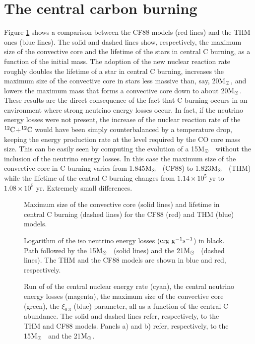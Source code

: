 \documentclass{aastex631}
\newcommand{\msun}{$\rm M_\odot$}
\newcommand\nuk[2]{$\rm ^{\rm #2} #1$}
\begin{document}
\section{The central carbon burning} \label{sec:carcen}
Figure \ref{fig:cbur} shows a comparison between the CF88 models (red lines) and the THM ones (blue lines). The solid and dashed lines show, respectively, the maximum size of the convective core and the lifetime of the stars in central C burning, as a function of the initial mass. The adoption of the new nuclear reaction rate roughly doubles the lifetime of a star in central C burning, increases the maximum size of the convective core in stars less massive than, say, 20\msun, and lowers the maximum mass that forms a convective core down to about 20\msun. These results are the direct consequence of the fact that C burning occurs in an environment where strong neutrino energy losses occur. In fact, if the neutrino energy losses were not present, the increase of the nuclear reaction rate of the \nuk{C}{12}+\nuk{C}{12} would have been simply counterbalanced by a temperature drop, keeping the energy production rate at the level required by the CO core mass size. This can be easily seen by computing the evolution of a 15\msun~ without the inclusion of the neutrino energy losses. In this case the maximum size of the convective core in C burning varies from 1.845\msun~ (CF88) to 1.823\msun~ (THM) while the lifetime of the central C burning changes from $1.14\times10^{5}$ yr to $1.08\times10^{5}$ yr. Extremely small differences.

\begin{figure}[ht!]
\caption{Maximum size of the convective core (solid lines) and lifetime in central C burning (dashed lines) for the CF88 (red) and THM (blue) models. \label{fig:cbur}}
\end{figure}

\begin{figure}[ht!]
\caption{Logarithm of the iso neutrino energy losses ($\rm erg~g^{-1}s^{-1}$) in black. Path followed by the 15\msun~ (solid lines) and the 21\msun~ (dashed lines). The THM and the CF88 models are shown in blue and red, respectively. \label{fig:conftcroc}}
\end{figure}

\begin{figure}[ht!]
\caption{Run of of the central nuclear energy rate (cyan), the central neutrino energy losses (magenta), the maximum size of the convective core (green), the $\xi_{0.3}$ (blue) parameter, all as a function of the central C abundance. The solid and dashed lines refer, respectively, to the THM and CF88 models. Panels a) and b) refer, respectively, to the 15\msun~ and the 21\msun.\label{fig:carburan}}
\end{figure}
\end{document}

